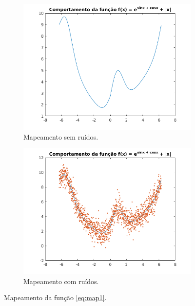 	\begin{figure}[h!]
	
	\centering
	
		\begin{subfigure}{.5\textwidth} 
		  \centering
		  \includegraphics[width=1\linewidth]{image/sem_ruidos_y_fx}
		  \caption{\centering Mapeamento sem ruídos.} 
		  \label{fig:map1_s_ruido} 
		  
		\end{subfigure}%
		\begin{subfigure}{.5\textwidth}
		  \centering
		  \includegraphics[width=1\linewidth]{image/com_ruidos_y_fx}
		  \caption{\centering Mapeamento com ruídos.}
		  \label{fig:map1_c_ruido} 
		\end{subfigure}
	
	
	\caption{Mapeamento da função \ref{eq:map1}.}
	\end{figure}
	
